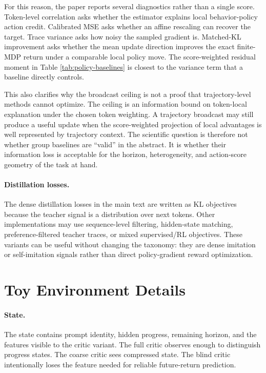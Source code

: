 \documentclass[11pt]{article}
\begin{document}
For this reason, the paper reports several diagnostics rather than a single
score. Token-level correlation asks whether the estimator explains local
behavior-policy action credit. Calibrated MSE asks whether an affine rescaling
can recover the target. Trace variance asks how noisy the sampled gradient is.
Matched-KL improvement asks whether the mean update direction improves the
exact finite-MDP return under a comparable local policy move. The
score-weighted residual moment in Table \ref{tab:policy-baselines} is closest
to the variance term that a baseline directly controls.

This also clarifies why the broadcast ceiling is not a proof that
trajectory-level methods cannot optimize. The ceiling is an information bound
on token-local explanation under the chosen token weighting. A trajectory
broadcast may still produce a useful update when the score-weighted projection
of local advantages is well represented by trajectory context. The scientific
question is therefore not whether group baselines are ``valid'' in the
abstract. It is whether their information loss is acceptable for the horizon,
heterogeneity, and action-score geometry of the task at hand.

\paragraph{Distillation losses.}
The dense distillation losses in the main text are written as KL objectives because the
teacher signal is a distribution over next tokens. Other implementations may
use sequence-level filtering, hidden-state matching, preference-filtered
teacher traces, or mixed supervised/RL objectives. These variants can be useful
without changing the taxonomy: they are dense imitation or self-imitation
signals rather than direct policy-gradient reward optimization.

\section{Toy Environment Details}

\paragraph{State.}
The state contains prompt identity, hidden progress, remaining horizon, and the
features visible to the critic variant. The full critic observes enough to
distinguish progress states. The coarse critic sees compressed state. The blind
critic intentionally loses the feature needed for reliable future-return
prediction.
\end{document}
